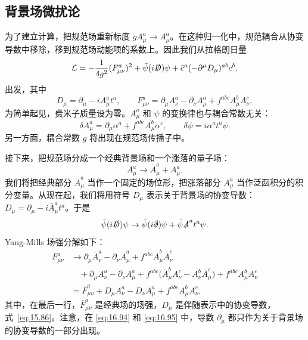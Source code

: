 \subsection{背景场微扰论}

为了建立计算，把规范场重新标度 $gA^a_\mu \to A^a_\mu$。在这种归一化中，规范耦合从协变导数中移除，移到规范场动能项的系数上。因此我们从拉格朗日量
\begin{equation}
  \mathcal{L} = -\frac{1}{4g^2}(F^a_{\mu\nu})^2 + \bar{\psi}(i\slashed{D})\psi
    + \bar{c}^a(-\partial^\mu D_\mu)^{ab}c^b ,
  \label{eq:16.90}
\end{equation}
出发，其中
\begin{equation}
  D_\mu = \partial_\mu - iA^a_\mu t^a,\qquad
  F^a_{\mu\nu} = \partial_\mu A^a_\nu - \partial_\nu A^a_\mu
    + f^{abc}A^b_\mu A^c_\nu ,
  \label{eq:16.91}
\end{equation}
为简单起见，费米子质量设为零。$A^a_\mu$ 和 $\psi$ 的变换律也与耦合常数无关：
\begin{equation}
  \delta A^a_\mu = \partial_\mu\alpha^a + f^{abc}A^b_\mu\alpha^c,\qquad
  \delta\psi = i\alpha^a t^a\psi .
  \label{eq:16.92}
\end{equation}
另一方面，耦合常数 $g$ 将出现在规范场传播子中。

接下来，把规范场分成一个经典背景场和一个涨落的量子场：
\begin{equation}
  A^a_\mu \to \bar{A}^a_\mu + A^a_\mu .
  \label{eq:16.93}
\end{equation}
我们将把经典部分 $\bar{A}^a_\mu$ 当作一个固定的场位形，把涨落部分 $A^a_\mu$ 当作泛函积分的积分变量。从现在起，我们将用符号 $D_\mu$ 表示关于背景场的协变导数：$D_\mu = \partial_\mu - i\bar{A}^a_\mu t^a$。于是
\begin{equation}
  \bar{\psi}(i\slashed{D})\psi \to \bar{\psi}(i\slashed{\partial})\psi
    + \bar{\psi}\slashed{A}^a t^a\psi .
  \label{eq:16.94}
\end{equation}
Yang-Mills 场强分解如下：
\begin{equation}
  \begin{aligned}
    F^a_{\mu\nu} &\to \partial_\mu\bar{A}^a_\nu - \partial_\nu\bar{A}^a_\mu
      + f^{abc}\bar{A}^b_\mu\bar{A}^c_\nu\\
    &\quad + \partial_\mu A^a_\nu - \partial_\nu A^a_\mu + f^{abc}\bigl(
      \bar{A}^b_\mu A^c_\nu - A^b_\nu\bar{A}^c_\mu \bigr) + f^{abc}A^b_\mu A^c_\nu\\
    &= \bar{F}^a_{\mu\nu} + D_\mu A^a_\nu - D_\nu A^a_\mu + f^{abc}A^b_\mu
      A^c_\nu ,
  \end{aligned}
  \label{eq:16.95}
\end{equation}
其中，在最后一行，$\bar{F}^a_{\mu\nu}$ 是经典场的场强，$D_\mu$ 是伴随表示中的协变导数，式~\eqref{eq:15.86}。注意，在 \eqref{eq:16.94} 和 \eqref{eq:16.95} 中，导数 $\partial_\mu$ 都只作为关于背景场的协变导数的一部分出现。

